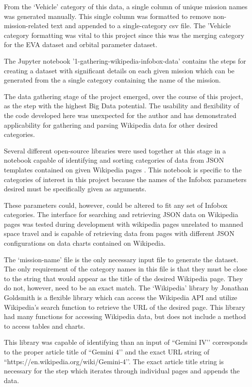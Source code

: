 \documentclass[sigconf]{acmart}
\begin{document}
From the ‘Vehicle’ category of this data, a single column of unique mission names was generated manually. This single column was formatted to remove non-mission-related text and appended to a single-category csv file. The 'Vehicle category formatting was vital to this project since this was the merging category for the EVA dataset and orbital parameter dataset.

The Jupyter notebook '1-gathering-wikipedia-infobox-data' contains the steps for creating a dataset with significant details on each given mission which can be generated from the a single category containing the name of the mission. 

The data gathering stage of the project emerged, over the course of this project, as the step with the highest Big Data potential. The usability and flexibility of the code developed here was unexpected for the author and has demonstrated applicability for gathering and parsing Wikipedia data for other desired categories.

Several different open-source libraries were used together at this stage in a notebook capable of identifying and sorting categories of data from JSON templates contained on given Wikipedia pages  \cite{stackoverflowquestions}. This notebook is specific to the categories of interest in this project because the names of the Infobox parameters desired must be specifically given as arguments. 

These parameters could, however, could be altered to fit any set of Infobox categories. The interface for searching and retrieving JSON data on Wikipedia pages was tested during development with wikipedia pages unrelated to manned space travel and is capable of retrieving data from pages with different JSON configurations on data charts contained on Wikipedia. 

The ‘mission-name’ file is the only necessary input file to generate the dataset. The only requirement of the category names in this file is that they must be close to the string that would appear as the title of the desired Wikipedia page. They do not, however, need to be an exact match. The `Wikipedia’ library by Jonathan Goldsmith \cite{Goldsmith2017} is a flexible library which can access the Wikipedia API and utilize Wikipedia’s search function to retrieve the URL of the desired page. This library had many functions for accessing Wikipedia data, but does not include a method to access tables and charts.

This library was capable of identifying than an input of ``Gemini IV’’ corresponds to the proper article title of ``Gemini 4’’ and the exact URL string of ``https://en.wikipedia.org/wiki/Gemini-4’’. The exact article title string is necessary for the step which iterates through individual pages and appends the data.
\end{document}
